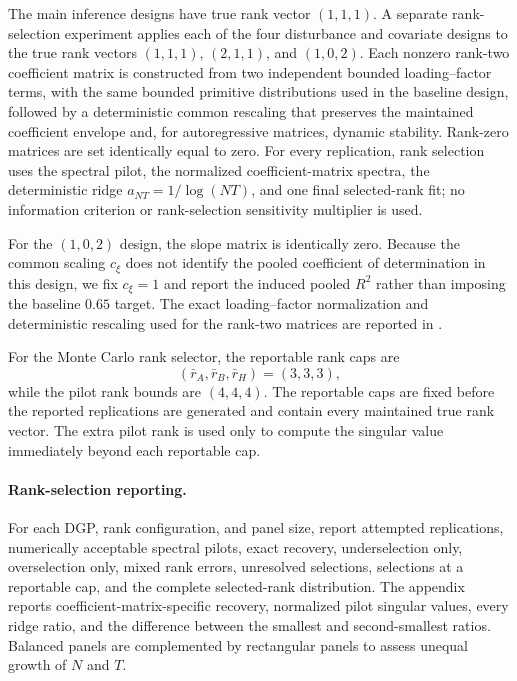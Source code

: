 \documentclass[11pt]{article}
\numberwithin{equation}{section}
\theoremstyle{remark}
\begin{document}
The main inference designs have true rank vector $(1,1,1)$. A separate rank-selection experiment applies each of the four disturbance and covariate designs to the true rank vectors $(1,1,1)$, $(2,1,1)$, and $(1,0,2)$. Each nonzero rank-two coefficient matrix is constructed from two independent bounded loading--factor terms, with the same bounded primitive distributions used in the baseline design, followed by a deterministic common rescaling that preserves the maintained coefficient envelope and, for autoregressive matrices, dynamic stability. Rank-zero matrices are set identically equal to zero. For every replication, rank selection uses the spectral pilot, the normalized coefficient-matrix spectra, the deterministic ridge $a_{NT}=1/\log(NT)$, and one final selected-rank fit; no information criterion or rank-selection sensitivity multiplier is used.

For the $(1,0,2)$ design, the slope matrix is identically zero. Because the common scaling $c_\xi$ does not identify the pooled coefficient of determination in this design, we fix $c_\xi=1$ and report the induced pooled $R^2$ rather than imposing the baseline $0.65$ target. The exact loading--factor normalization and deterministic rescaling used for the rank-two matrices are reported in .

For the Monte Carlo rank selector, the reportable rank caps are
$$
(\bar r_A,\bar r_B,\bar r_H)=(3,3,3),
$$
while the pilot rank bounds are $(4,4,4)$. The reportable caps are fixed before the reported replications are generated and contain every maintained true rank vector. The extra pilot rank is used only to compute the singular value immediately beyond each reportable cap.


\paragraph{Rank-selection reporting.}
For each DGP, rank configuration, and panel size, report attempted replications, numerically acceptable spectral pilots, exact recovery, underselection only, overselection only, mixed rank errors, unresolved selections, selections at a reportable cap, and the complete selected-rank distribution. The appendix reports coefficient-matrix-specific recovery, normalized pilot singular values, every ridge ratio, and the difference between the smallest and second-smallest ratios. Balanced panels are complemented by rectangular panels to assess unequal growth of $N$ and $T$.
\end{document}
